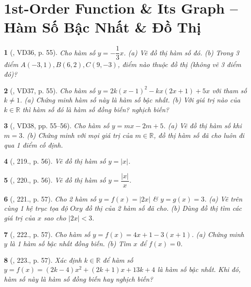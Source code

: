 \documentclass{article}
\newtheorem{baitoan}{}
\begin{document}

\section{1st-Order Function \& Its Graph -- Hàm Số Bậc Nhất \& Đồ Thị}

\begin{baitoan}[\cite{Tuyen_Toan_8}, VD36, p. 55]
	Cho hàm số $y = -\dfrac{1}{3}x$. (a) Vẽ đồ thị hàm số đó. (b) Trong 3 điểm $A(-3,1),B(6,2),C(9,-3)$, điểm nào thuộc đồ thị (không vẽ 3 điểm đó)?
\end{baitoan}

\begin{baitoan}[\cite{Tuyen_Toan_8}, VD37, p. 55]
	Cho hàm số $y = 2k(x - 1)^2 - kx(2x + 1) + 5x$ với tham số $k\ne1$. (a) Chứng minh hàm số này là hàm số bậc nhất. (b) Với giá trị nào của $k\in\mathbb{R}$ thì hàm số đó là hàm số đồng biến? nghịch biến?
\end{baitoan}

\begin{baitoan}[\cite{Tuyen_Toan_8}, VD38, pp. 55--56]
	Cho hàm số $y = mx - 2m + 5$. (a) Vẽ đồ thị hàm số khi $m = 3$. (b) Chứng minh với mọi giá trị của $m\in\mathbb{R}$, đồ thị hàm số đã cho luôn đi qua 1 điểm cố định.
\end{baitoan}

\begin{baitoan}[\cite{Tuyen_Toan_8}, 219., p. 56]
	Vẽ đồ thị hàm số $y = |x|$.
\end{baitoan}

\begin{baitoan}[\cite{Tuyen_Toan_8}, 220., p. 56]
	Vẽ đồ thị hàm số $y = \dfrac{|x|}{x}$.
\end{baitoan}

\begin{baitoan}[\cite{Tuyen_Toan_8}, 221., p. 57]
	Cho 2 hàm số $y = f(x) = |2x|$ \& $y = g(x) = 3$. (a) Vẽ trên cùng 1 hệ trục tọa độ $Oxy$ đồ thị của 2 hàm số đã cho. (b) Dùng đồ thị tìm các giá trị của $x$ sao cho $|2x| < 3$.
\end{baitoan}

\begin{baitoan}[\cite{Tuyen_Toan_8}, 222., p. 57]
	Cho hàm số $y = f(x) = 4x + 1 - 3(x + 1)$. (a) Chứng minh $y$ là 1 hàm số bậc nhất đồng biến. (b) Tìm $x$ để $f(x) = 0$.
\end{baitoan}

\begin{baitoan}[\cite{Tuyen_Toan_8}, 223., p. 57]
	Xác định $k\in\mathbb{R}$ để hàm số $y = f(x) = (2k - 4)x^2 + (2k + 1)x + 13k + 4$ là hàm số bậc nhất. Khi đó, hàm số này là hàm số đồng biến hay nghịch biến?
\end{baitoan}
\end{document}
